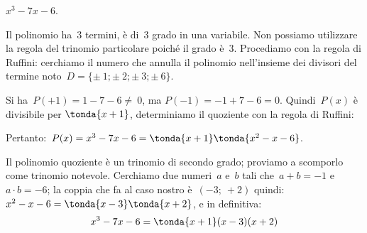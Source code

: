  \begin{esempio}
 \(x^3-7x-6\).

Il polinomio ha~3 termini, è di~3{\textdegree} grado in una variabile.
Non possiamo utilizzare la regola del trinomio particolare poiché il
grado è~3. Procediamo con la regola di Ruffini: cerchiamo il numero che annulla 
il polinomio nell'insieme dei divisori del termine
noto~\(D=\{\pm~1;\pm~2;\pm~3;\pm~6\}\).

\begin{multicols}{2}
 Si ha~\(P(+1)=1-7-6\neq~0\), ma \(P(-1)=-1+7-6=0\).
Quindi~\(P(x)\) è divisibile per \(\tonda{x+1}\), determiniamo 
il quoziente con la regola di Ruffini:

%  
\begin{inaccessibleblock}
% 
\scompruffinie
\end{inaccessibleblock}

\end{multicols}

Pertanto:~\(P(x)=x^3-7x-6=\tonda{x+1} \tonda{x^{2}-x-6}\).

Il polinomio quoziente è un trinomio di secondo grado; proviamo a
scomporlo come trinomio notevole.
Cerchiamo due numeri~\(a\) e~\(b\) tali che~\(a+b=-1\) e~\(a\cdot b=-6\); 
la coppia che fa al caso nostro è~\((-3;~+2)\) quindi: 
\(x^2-x-6 = \tonda{x-3} \tonda{x+2}\), e in definitiva:
\[x^{{3}}-7x-6 = \tonda{x+1} (x-3) (x+2)\]

 \end{esempio}
%  
% 
% 
% 
